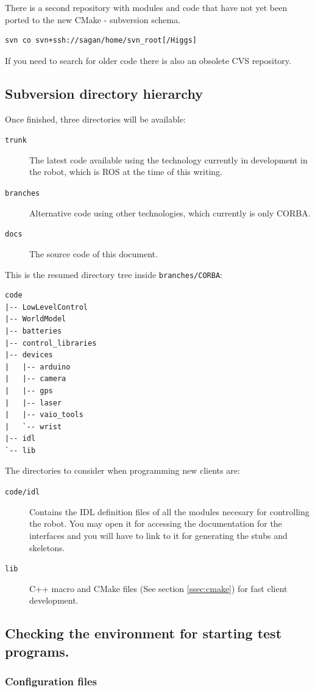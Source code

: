 There is a second repository with modules and code that have not yet been ported to the new CMake - subversion schema.
\begin{verbatim}
svn co svn+ssh://sagan/home/svn_root[/Higgs]
\end{verbatim}
If you need to search for older code there is also an obsolete CVS repository.

\subsection{Subversion directory hierarchy}

Once finished, three directories will be available:
\begin{description}
\item[\texttt{trunk}] The latest code available using the technology currently in development in the robot, which is ROS at the time of this writing.
\item[\texttt{branches}] Alternative code using other technologies, which currently is only CORBA.
\item[\texttt{docs}] The source code of this document.
\end{description}

This is the resumed directory tree inside \texttt{branches/CORBA}:
\begin{verbatim}
code
|-- LowLevelControl
|-- WorldModel
|-- batteries
|-- control_libraries
|-- devices
|   |-- arduino
|   |-- camera
|   |-- gps
|   |-- laser
|   |-- vaio_tools
|   `-- wrist
|-- idl
`-- lib
\end{verbatim}
The directories to consider when programming new clients are:
\begin{description}
\item[\texttt{code/idl}] Contains the IDL definition files of all the modules necesary for controlling the robot. You may open it for accessing the documentation for the interfaces and you will have to link to it for generating the stubs and skeletons.
\item[\texttt{lib}] C++ macro and CMake files (See section \ref{ssec:cmake}) for fast client development.
\end{description}


\subsection{Checking the environment for starting test programs.}

\subsubsection{Configuration files}


